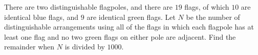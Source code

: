 There are two distinguishable flagpoles, and there are $ 19$ flags, of which $ 10$ are identical blue flags, and $ 9$ are identical green flags. Let $ N$ be the number of distinguishable arrangements using all of the flags in which each flagpole has at least one flag and no two green flags on either pole are adjacent. Find the remainder when $ N$ is divided by $ 1000$.